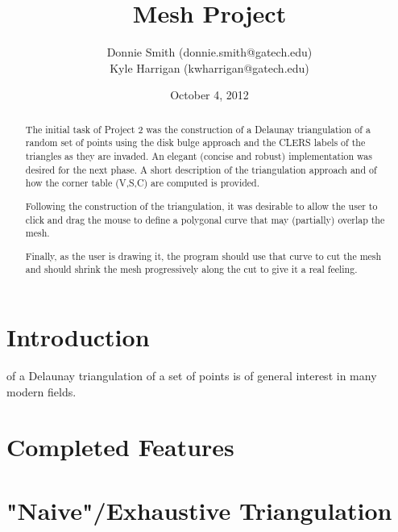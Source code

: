 \documentclass[letterpaper,10pt]{IEEEtran}
\title{Mesh Project}
\author{
Donnie Smith (donnie.smith@gatech.edu) \\
Kyle Harrigan (kwharrigan@gatech.edu) 
}
\date{October 4, 2012}                                           %
\begin{document}
\maketitle

%


 \begin{abstract}
 
The initial task of Project 2 was the construction of a Delaunay triangulation of a random set of points using the disk bulge approach and the CLERS labels of the triangles as they are invaded.  An elegant (concise and robust) implementation was desired for the next phase. A short description of the triangulation approach and of how the corner table (V,S,C) are computed is provided.

Following the construction of the triangulation, it was desirable to allow the user to click and drag the mouse to define a polygonal curve that may (partially) overlap the mesh.

Finally, as the user is drawing it, the program should use that curve to cut the mesh and should shrink the mesh progressively along the cut to give it a real feeling.
 
 \end{abstract}

\section{Introduction}
 of a Delaunay triangulation of a set of points is of general interest in many modern fields. 
 \section{Completed Features}
 
\section{"Naive"/Exhaustive Triangulation}
\end{document}
